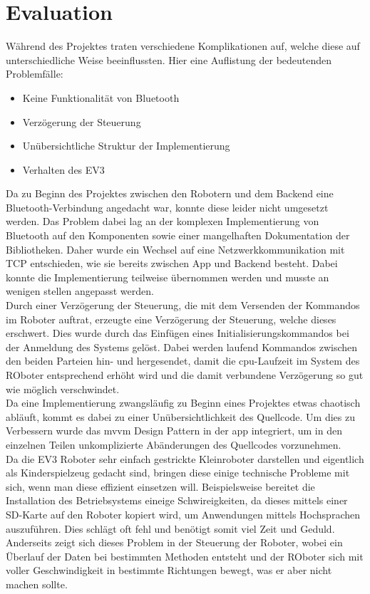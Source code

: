 \section{Evaluation}

Während des Projektes traten verschiedene Komplikationen auf, welche diese auf unterschiedliche Weise beeinflussten. Hier eine Auflistung der bedeutenden Problemfälle:

\begin{itemize}
	\item Keine Funktionalität von Bluetooth
	\item Verzögerung der Steuerung
	\item Unübersichtliche Struktur der Implementierung
	\item Verhalten des EV3
\end{itemize}

\noindent
Da zu Beginn des Projektes zwischen den Robotern und dem Backend eine Bluetooth-Verbindung angedacht war, konnte diese leider nicht umgesetzt werden. Das Problem dabei lag an der komplexen Implementierung von Bluetooth auf den Komponenten sowie einer mangelhaften Dokumentation der Bibliotheken. Daher wurde ein Wechsel auf eine Netzwerkkommunikation mit TCP entschieden, wie sie bereits zwischen App und Backend besteht. Dabei konnte die Implementierung teilweise übernommen werden und musste an wenigen stellen angepasst werden.\\

\noindent
Durch einer Verzögerung der Steuerung, die mit dem Versenden der Kommandos im Roboter auftrat, erzeugte eine Verzögerung der Steuerung, welche dieses erschwert. Dies wurde durch das Einfügen eines Initialisierungskommandos bei der Anmeldung des Systems gelöst. Dabei werden laufend Kommandos zwischen den beiden Parteien hin- und hergesendet, damit die \gls{cpu}-Laufzeit im System des ROboter entsprechend erhöht wird und die damit verbundene Verzögerung so gut wie möglich verschwindet.\\

\noindent
Da eine Implementierung zwangsläufig zu Beginn eines Projektes etwas chaotisch abläuft, kommt es dabei zu einer Unübersichtlichkeit des Quellcode. Um dies zu Verbessern wurde das \gls{mvvm} Design Pattern in der \gls{app} integriert, um in den einzelnen Teilen unkomplizierte Abänderungen des Quellcodes vorzunehmen.\\

\noindent
Da die EV3 Roboter sehr einfach gestrickte Kleinroboter darstellen und eigentlich als Kinderspielzeug gedacht sind, bringen diese einige technische Probleme mit sich, wenn man diese effizient einsetzen will. Beispielsweise bereitet die Installation des Betriebsystems eineige Schwireigkeiten, da dieses mittels einer SD-Karte auf den Roboter kopiert wird, um Anwendungen mittels Hochsprachen auszuführen. Dies schlägt oft fehl und benötigt somit viel Zeit und Geduld. Anderseits zeigt sich dieses Problem in der Steuerung der Roboter, wobei ein Überlauf der Daten bei bestimmten Methoden entsteht und der ROboter sich mit voller Geschwindigkeit in bestimmte Richtungen bewegt, was er aber nicht machen sollte.\\

